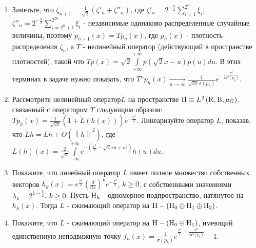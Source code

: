 $ $
\begin{ordre}
$ $
\begin{enumerate}

\item Заметьте, что $\zeta _{n+1} =\frac{1}{\sqrt 2 }\left( {\zeta '_n 
+\zeta ''_n } \right)$, где $\zeta '_n 
=2^{-\frac{n}{2}}\sum\limits_{i=1}^{2^n} {\xi _i } $, $\zeta ''_n 
=2^{-\frac{n}{2}}\sum\limits_{i=2^n+1}^{2^{2n}} {\xi _i } $ - независимые 
одинаково распределенные случайные величины, поэтому $p_{n+1} (x)=Tp_n (x)$, 
где $p_n (x)$ - плотность распределения $\zeta _n $, а $T$ - нелинейный 
оператор (действующий в пространстве плотностей), такой что $Tp(x)=\sqrt 2 
\int\limits_{-\infty }^{+\infty } {p(\sqrt 2 x-u)p(u)du} $. В этих терминах 
в задаче нужно показать, что $T^np_h (x)\mathop \to \limits_{n\to \infty } 
\frac{1}{\sqrt {2\pi } \sigma (p_h )}e^{-\frac{x^2}{2\sigma ^2(p_h )}}$. 

\item Рассмотрите нелинейный оператор$\tilde {L}$ на пространстве ${\rm 
H}\equiv L^2\left( {{\rm R},{\rm B},\mu _G } \right)$, связанный с 
оператором $T$ следующим образом: $Tp_h (x)=\frac{1}{\sqrt {2\pi } }\left( 
{1+\tilde {L}\left( {h(x)} \right)} \right)e^{-\frac{x^2}{2}}$. Линеаризуйте 
оператор $\tilde {L}$, показав, что $\tilde {L}h=Lh+O\left( {\left\| h 
\right\|^2} \right)$, где $L(h)(x)=\frac{2}{\sqrt \pi }\int\limits_{-\infty 
}^{+\infty } {e^{-\left( {\frac{x^2}{2}-\sqrt 2 xu+u^2} \right)}h(u)du} $.

\item Покажите, что линейный оператор $L$ имеет полное множество собственных 
векторов $h_k (x)=e^{\frac{x^2}{2}}\left( {\frac{d}{dx}} 
\right)^ke^{-\frac{x^2}{2}}$, $k\ge 0$, с собственными значениями $\lambda 
_k =2^{1-\frac{k}{2}}$, $k\ge 0$. Пусть ${\rm H}_k $ - одномерное 
подпространство, натянутое на $h_k (x)$. Тогда $L$ - сжимающий оператор на 
${\rm H}-\left( {{\rm H}_0 \oplus {\rm H}_1 \oplus {\rm H}_2 } \right)$.

\item Покажите, что $\tilde {L}$ - сжимающий оператор на ${\rm H}-\left( {{\rm 
H}_0 \oplus {\rm H}_1 } \right)$, имеющий единственную неподвижную точку 
$f_h (x)=\frac{1}{\sigma (p_h )}e^{\frac{x^2}{2}-\frac{x^2}{2\sigma ^2(p_h 
)}}-1$.


\end{enumerate}

\end{ordre}




